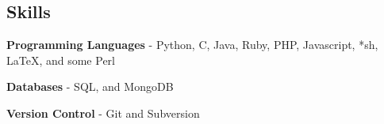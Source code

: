 \documentclass[margin]{res}
\begin{document}
\begin{resume}
%

\section{Skills}
	{\bf Programming Languages} - Python, C, Java, Ruby, PHP, Javascript, *sh,
    LaTeX, and some Perl

	{\bf Databases} - SQL, and MongoDB


	{\bf Version Control} - Git and Subversion


\end{resume} 
\end{document}
